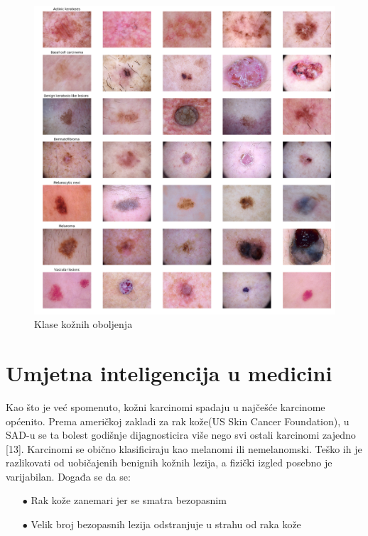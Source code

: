 \documentclass[times, utf8, zavrsni]{fer}
\begin{document}
\begin{figure}[!h]
\hspace{-0.05\textwidth}
\includegraphics[width=1.1\textwidth]{./slike/skin-diseases}
\caption{Klase kožnih oboljenja}
\label{fig:koza-bolesti}
\end{figure}
%
\newpage

\section{Umjetna inteligencija u medicini}

\indent{}
Kao što je već spomenuto, kožni karcinomi spadaju u najčešće karcinome općenito. Prema američkoj zakladi za rak kože(US Skin Cancer Foundation), u SAD-u se ta bolest godišnje dijagnosticira više nego svi ostali karcinomi zajedno [13]. Karcinomi se obično klasificiraju kao melanomi ili nemelanomski. Teško ih je razlikovati od uobičajenih benignih kožnih lezija, a fizički izgled posebno je varijabilan. Događa se da se:

\begin{itemize}
\item[$\bullet$] Rak kože zanemari jer se smatra bezopasnim
\item[$\bullet$] Velik broj bezopasnih lezija odstranjuje u strahu od raka kože
\end{itemize}
\end{document}
